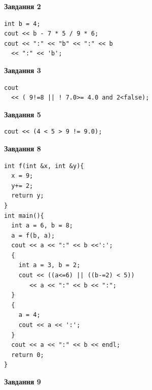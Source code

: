 \documentclass[12pt, ukrainian]{article}
\begin{document}
{\begin {large}
\begin{minipage}[t]{7.0cm}
\end{minipage}
\vline \hspace{1mm}
\begin{minipage}[t]{11.0cm}

\begin{center}
\textbf{Завдання 2}
\end{center}
\vspace{-8mm}

\begin{verbatim}
int b = 4;
cout << b - 7 * 5 / 9 * 6;
cout << ":" << "b" << ":" << b 
  << ":" << 'b';
\end{verbatim}



\begin{center}
\textbf{Завдання 3}
\end{center}
\vspace{-8mm}

\begin{verbatim}
cout 
  << ( 9!=8 || ! 7.0>= 4.0 and 2<false);
\end{verbatim}



\begin{center}
\textbf{Завдання 5}
\end{center}
\vspace{-8mm}

\begin{verbatim}
cout << (4 < 5 > 9 != 9.0);
\end{verbatim}



\begin{center}
\textbf{Завдання 8}
\end{center}
\vspace{-8mm}

\begin{verbatim}
int f(int &x, int &y){
  x = 9;
  y+= 2;
  return y;
}
int main(){
  int a = 6, b = 8;
  a = f(b, a);
  cout << a << ":" << b <<':';
  {
    int a = 3, b = 2;
    cout << ((a<=6) || ((b-=2) < 5))
       << a << ":" << b << ":";
  }
  {
    a = 4;
    cout << a << ':';
  }
  cout << a << ":" << b << endl;
  return 0;
}
\end{verbatim}

\end{minipage}


\begin{minipage}[t]{7.0cm}

\begin{center}
\textbf{Завдання 9}
\end{center}
\vspace{-8mm}


\end{minipage}
\end{large}}
\end{document}
